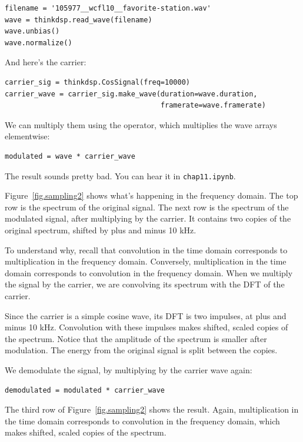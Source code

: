 \documentclass[12pt]{book}
\begin{document}
\begin{verbatim}
filename = '105977__wcfl10__favorite-station.wav'
wave = thinkdsp.read_wave(filename)
wave.unbias()
wave.normalize()
\end{verbatim}

And here's the carrier:

\begin{verbatim}
carrier_sig = thinkdsp.CosSignal(freq=10000)
carrier_wave = carrier_sig.make_wave(duration=wave.duration, 
                                     framerate=wave.framerate)
\end{verbatim}

We can multiply them using the {\tt *} operator, which multiplies
the wave arrays elementwise:

\begin{verbatim}
modulated = wave * carrier_wave
\end{verbatim}

The result sounds pretty bad.  You can hear it in {\tt chap11.ipynb}.

Figure~\ref{fig.sampling2} shows what's happening in the frequency
domain.  The top row is the spectrum of the original signal.  The
next row is the spectrum of the modulated signal, after multiplying
by the carrier.  It contains two copies of the original spectrum,
shifted by plus and minus 10 kHz.

To understand why, recall that convolution in the time domain corresponds
to multiplication in the frequency domain.  Conversely, multiplication
in the time domain corresponds to convolution in the frequency domain.
When we multiply the signal by the carrier, we are convolving its
spectrum with the DFT of the carrier.

Since the carrier is a simple cosine wave, its DFT is two impulses, at
plus and minus 10 kHz.  Convolution with these impulses makes
shifted, scaled copies of the spectrum.  Notice that the amplitude of
the spectrum is smaller after modulation.  The energy from the original
signal is split between the copies.

We demodulate the signal, by multiplying by the carrier wave again:

\begin{verbatim}
demodulated = modulated * carrier_wave
\end{verbatim}

The third row of Figure~\ref{fig.sampling2} shows the result.  Again,
multiplication in the time domain corresponds to convolution in the
frequency domain, which makes shifted, scaled copies of the spectrum.
\end{document}

